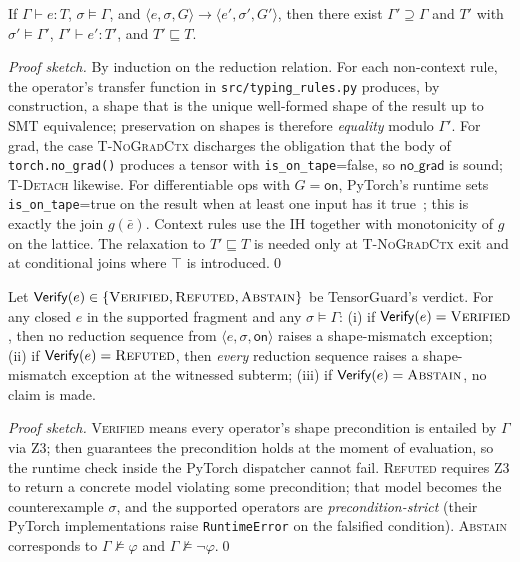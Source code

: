 \begin{theorem}
\label{thm:preservation}
If $\Gamma\vdash e:T$, $\sigma\models\Gamma$, and $\langle
e,\sigma,G\rangle\to\langle e',\sigma',G'\rangle$, then there
exist $\Gamma'\supseteq\Gamma$ and $T'$ with
$\sigma'\models\Gamma'$, $\Gamma'\vdash e':T'$, and
$T'\sqsubseteq T$.
\end{theorem}
\begin{proof}[Proof sketch]
By induction on the reduction relation. For each non-context
rule, the operator's transfer function in
\texttt{src/typing\_rules.py} produces, by construction, a shape
that is the unique well-formed shape of the result up to SMT
equivalence; preservation on shapes is therefore
\emph{equality} modulo $\Gamma'$. For grad, the case
\textsc{T-NoGradCtx} discharges the obligation that the body
of \texttt{torch.no\_grad()} produces a tensor with
\texttt{is\_on\_tape}{=}false, so $\mathsf{no\_grad}$ is sound;
\textsc{T-Detach} likewise. For differentiable ops with $G=\mathsf{on}$,
PyTorch's runtime sets \texttt{is\_on\_tape}{=}true on the result
when at least one input has it true~\cite{paszke2019pytorch};
this is exactly the join $g(\bar e)$. Context rules use the IH
together with monotonicity of $g$ on the lattice. The relaxation
to $T'\sqsubseteq T$ is needed only at \textsc{T-NoGradCtx} exit
and at conditional joins where $\top$ is introduced.\qed
\end{proof}

\begin{theorem}
\label{thm:progress}
Let $\mathsf{Verify}(e)\in\{\textsc{Verified},\textsc{Refuted},\textsc{Abstain}\}$
be TensorGuard's verdict. For any closed $e$ in the supported
fragment and any $\sigma\models\Gamma$:
(i) if $\mathsf{Verify}(e)=\textsc{Verified}$, then no reduction
sequence from $\langle e,\sigma,\mathsf{on}\rangle$ raises a
shape-mismatch exception; (ii) if
$\mathsf{Verify}(e)=\textsc{Refuted}$, then \emph{every} reduction
sequence raises a shape-mismatch exception at the witnessed
subterm; (iii) if $\mathsf{Verify}(e)=\textsc{Abstain}$, no claim
is made.
\end{theorem}
\begin{proof}[Proof sketch]
\textsc{Verified} means every operator's shape precondition is
entailed by $\Gamma$ via Z3;  then
guarantees the precondition holds at the moment of evaluation, so
the runtime check inside the PyTorch dispatcher cannot fail.
\textsc{Refuted} requires Z3 to return a concrete model violating
some precondition; that model becomes the counterexample
$\sigma$, and the supported operators are
\emph{precondition-strict} (their PyTorch implementations raise
\texttt{RuntimeError} on the falsified condition).
\textsc{Abstain} corresponds to $\Gamma\not\models\varphi$ and
$\Gamma\not\models\neg\varphi$.\qed
\end{proof}

